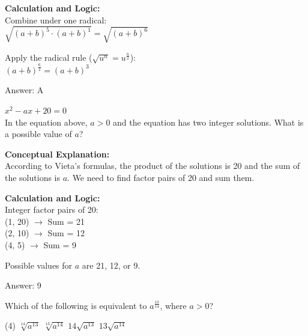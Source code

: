 \documentclass[11pt,paper=a4,answers]{exam}
\begin{document}
\begin{questions}
\begin{solution}
\vspace{20pt}

\textbf{Calculation and Logic:} \\
Combine under one radical: \\
$\sqrt{(a+b)^5 \cdot (a+b)^1} = \sqrt{(a+b)^6}$

\vspace{10pt}

Apply the radical rule ($ \sqrt{u^n} = u^{\frac{n}{2}} $): \\
$(a+b)^{\frac{6}{2}} = (a+b)^3$

\vspace{25pt}

Answer: \colorbox{yellow!100}{A}
\end{solution}

\vspace{40pt}

\question
$x^2 - ax + 20 = 0$ \\
In the equation above, $a > 0$ and the equation has two integer solutions. What is a possible value of $a$?

\begin{solution}
\textbf{Conceptual Explanation:} \\
According to Vieta's formulas, the product of the solutions is 20 and the sum of the solutions is $a$. We need to find factor pairs of 20 and sum them.

\vspace{20pt}

\textbf{Calculation and Logic:} \\
Integer factor pairs of 20: \\
(1, 20) $\rightarrow$ Sum = 21 \\
(2, 10) $\rightarrow$ Sum = 12 \\
(4, 5) $\rightarrow$ Sum = 9

\vspace{10pt}

Possible values for $a$ are 21, 12, or 9.

\vspace{25pt}

Answer: \colorbox{yellow!100}{9}
\end{solution}

\vspace{40pt}

\question
Which of the following is equivalent to $a^{\frac{13}{14}}$, where $a > 0$?
\begin{tasks}(4)
    \task $\sqrt[14]{a^{13}}$
    \task $\sqrt[13]{a^{14}}$
    \task $14\sqrt{a^{13}}$
    \task $13\sqrt{a^{14}}$
\end{tasks}


\end{questions}
\end{document}

